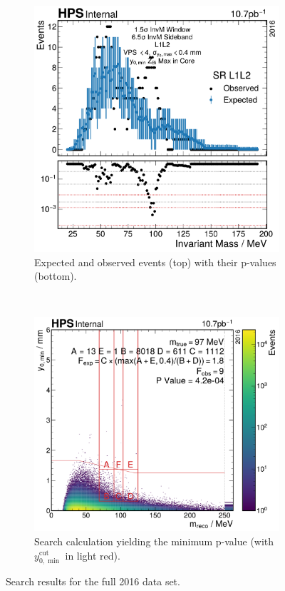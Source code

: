 \begin{figure}
  \centering
  \begin{subfigure}{0.48\textwidth}
    \includegraphics[width=\textwidth]{figures/hps/analysis/results/search.pdf}
    \caption{Expected and observed events (top) with their p-values (bottom).}
    \label{fig:search:all}
  \end{subfigure}
  ~
  \begin{subfigure}{0.48\textwidth}
    \includegraphics[width=\textwidth]{figures/hps/analysis/results/search-min-p-val.pdf}
    \caption{Search calculation yielding the minimum p-value
    (with $y_{0,\min}^\mathrm{cut}$ in light red).}
    \label{fig:search:min-p-val}
  \end{subfigure}
  \caption{Search results for the full 2016 data set.}
  \label{fig:search}
\end{figure}

